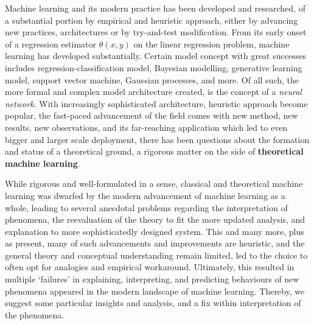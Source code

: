 \documentclass[twoside,10pt]{article}
\begin{document}
Machine learning and its modern practice has been developed and researched, of a substantial portion by empirical and heuristic approach, either by advancing new practices, architectures or by try-and-test modification. From its early onset of a regression estimator $\theta(x,y)$ on the linear regression problem, machine learning has developed substantially. Certain model concept with great successes includes regression-classification model, Bayesian modelling, generative learning model, support vector machine, Gaussian processes, and more. Of all such, the more formal and complex model architecture created, is the concept of a \textit{neural network}. With increasingly sophisticated architecture, heuristic approach become popular, the fast-paced advancement of the field comes with new method, new results, new observations, and its far-reaching application which led to even bigger and larger scale deployment, there has been questions about the formation and status of a theoretical ground, a rigorous matter on the side of \textbf{theoretical machine learning}.

While rigorous and well-formulated in a sense, classical and theoretical machine learning was dwarfed by the modern advancement of machine learning as a whole, leading to several anecdotal problems regarding the interpretation of phenomena, the reevaluation of the theory to fit the more updated analysis, and explanation to more sophisticatedly designed system. This and many more, plus as present, many of such advancements and improvements are heuristic, and the general theory and conceptual understanding remain limited, led to the choice to often opt for analogies and empirical workaround. Ultimately, this resulted in multiple `failures' in explaining, interpreting, and predicting behaviours of new phenomena appeared in the modern landscape of machine learning. Thereby, we suggest some particular insights and analysis, and a fix within interpretation of the phenomena. 
\end{document}
